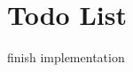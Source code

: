 \chapter{Todo List}
\hypertarget{todo}{}\label{todo}

\begin{DoxyRefList}
\item[Class \doxylink{classrenderer_1_1Button}{renderer\+::Button} ]\label{todo__todo000001}%
%
finish implementation 
\end{DoxyRefList}